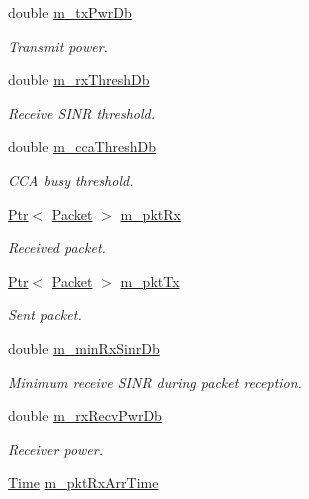 \begin{DoxyCompactItemize}
double \hyperlink{classns3_1_1UanPhyGen_a8d21ce8d4968ac89d118da47530f7428}{m\+\_\+tx\+Pwr\+Db}
\begin{DoxyCompactList}\small\item\em Transmit power. \end{DoxyCompactList}\item 
double \hyperlink{classns3_1_1UanPhyGen_a6ec1e85d014bee5481cee7882ded946c}{m\+\_\+rx\+Thresh\+Db}
\begin{DoxyCompactList}\small\item\em Receive S\+I\+NR threshold. \end{DoxyCompactList}\item 
double \hyperlink{classns3_1_1UanPhyGen_a72db86114a294c5c5678eabbbdc996f9}{m\+\_\+cca\+Thresh\+Db}
\begin{DoxyCompactList}\small\item\em C\+CA busy threshold. \end{DoxyCompactList}\item 
\hyperlink{classns3_1_1Ptr}{Ptr}$<$ \hyperlink{classns3_1_1Packet}{Packet} $>$ \hyperlink{classns3_1_1UanPhyGen_a62bb9d948402d5a6bf95b23ca8411b66}{m\+\_\+pkt\+Rx}
\begin{DoxyCompactList}\small\item\em Received packet. \end{DoxyCompactList}\item 
\hyperlink{classns3_1_1Ptr}{Ptr}$<$ \hyperlink{classns3_1_1Packet}{Packet} $>$ \hyperlink{classns3_1_1UanPhyGen_ada7c2cd782b02a4048df9dfc8970017c}{m\+\_\+pkt\+Tx}
\begin{DoxyCompactList}\small\item\em Sent packet. \end{DoxyCompactList}\item 
double \hyperlink{classns3_1_1UanPhyGen_aa44c213593b93a7d0052819240e54a69}{m\+\_\+min\+Rx\+Sinr\+Db}
\begin{DoxyCompactList}\small\item\em Minimum receive S\+I\+NR during packet reception. \end{DoxyCompactList}\item 
double \hyperlink{classns3_1_1UanPhyGen_a476fe8377d9db0f010e4d1b0e7100f7c}{m\+\_\+rx\+Recv\+Pwr\+Db}
\begin{DoxyCompactList}\small\item\em Receiver power. \end{DoxyCompactList}\item 
\hyperlink{classns3_1_1Time}{Time} \hyperlink{classns3_1_1UanPhyGen_a33a47b583aae2385b33cf10aec496739}{m\+\_\+pkt\+Rx\+Arr\+Time}

\end{DoxyCompactItemize}
